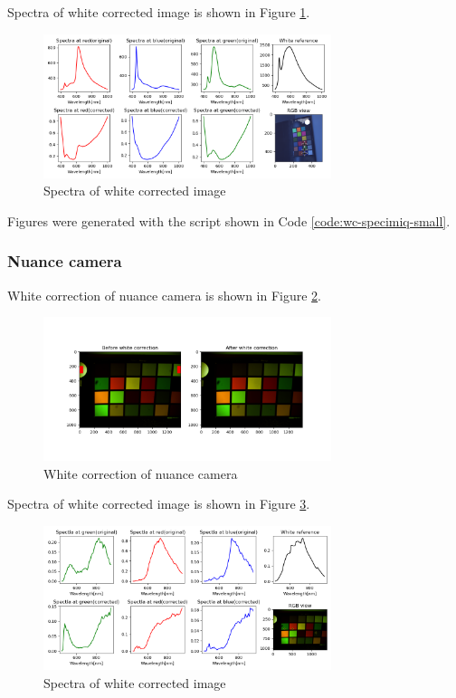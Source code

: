 Spectra of white corrected image is shown in Figure \ref{fig:wc-specimiq-small-spectra}.

\begin{figure}[H]
    \centering
    \caption{Spectra of white corrected image}
    \label{fig:wc-specimiq-small-spectra}
    \includegraphics[width=0.75\textwidth]{./fig-task1/wc-specimiq-small-spectra.png}
\end{figure}

Figures were generated with the script shown in Code \ref{code:wc-specimiq-small}.


\subsubsection{Nuance camera}

White correction of nuance camera is shown in Figure \ref{fig:wc-nuance-camera-small}.

\begin{figure}[H]
    \centering
    \caption{White correction of nuance camera}
    \label{fig:wc-nuance-camera-small}
    \includegraphics[width=0.75\textwidth]{./fig-task1/wc-nuance-small.png}
\end{figure}

Spectra of white corrected image is shown in Figure \ref{fig:wc-nuance-camera-small-spectra}.

\begin{figure}[H]
    \centering
    \caption{Spectra of white corrected image}
    \label{fig:wc-nuance-camera-small-spectra}
    \includegraphics[width=0.75\textwidth]{./fig-task1/wc-nuance-spectra-small.png}
\end{figure}

